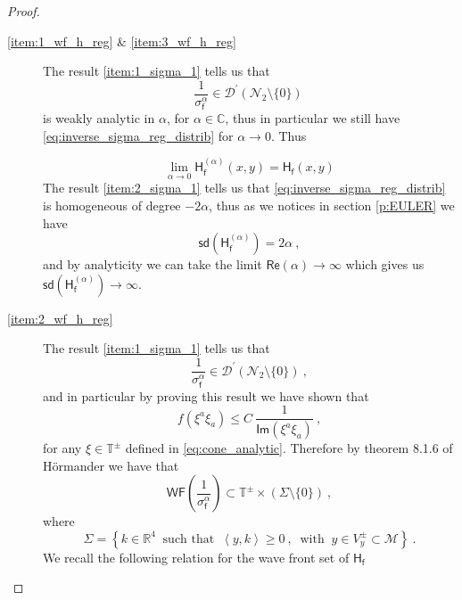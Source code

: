 \documentclass[11pt]{book}
\newcommand{\hilight}[1]{\colorbox{yellow!80!black}{#1}}
\newcommand{\WF}{\mathsf{WF}}
\newcommand{\sd}{\mathsf{sd}}
\renewcommand{\Re}{\mathsf{Re}}
\renewcommand{\Im}{\mathsf{Im}}
\newcommand{\sm}[1]{\left\langle#1\right\rangle}
\newcommand{\Dcal}{\mathcal{D}}
\newcommand{\Mcal}{\mathcal{M}}
\newcommand{\Ncal}{\mathcal{N}}
\newcommand{\Cbb}{\mathbb{C}}
\newcommand{\Rbb}{\mathbb{R}}
\newcommand{\Tbb}{\mathbb{T}}
\newcommand{\Hsf}{\mathsf{H}}
\newcommand{\fsf}{\mathsf{f}}
\theoremstyle{break}
\begin{document}
\begin{proof}
\begin{description}
\item[\ref{item:1_wf_h_reg} \& \ref{item:3_wf_h_reg}] 
%
The result \ref{item:1_sigma_1} tells us that 
%
\begin{equation*}
\frac{1}{\sigma_\fsf^\alpha} \in \Dcal^\prime(\Ncal_2\setminus\{0\}) \
\label{eq:inverse_sigma_reg_distrib}
\end{equation*}
%
is weakly analytic in $\alpha$, for $\alpha\in\Cbb$, thus in particular we still have \eqref{eq:inverse_sigma_reg_distrib} for $\alpha\to0$. Thus

\begin{equation*}
\lim_{\alpha\to0} \Hsf^{(\alpha)}_\fsf(x,y) = \Hsf_\fsf(x,y) 
\end{equation*}
%
The result \ref{item:2_sigma_1} tells us that \eqref{eq:inverse_sigma_reg_distrib} is homogeneous of degree $-2\alpha$, thus as we notices in section \ref{p:EULER} we have 
%
\begin{equation*}
\sd(\Hsf^{(\alpha)}_\fsf) = 2\alpha \ ,
\end{equation*}
%
and by analyticity we can take the limit \hilight{$\Re(\alpha) \to \infty$ which gives us $\sd(\Hsf^{(\alpha)}_\fsf)\to\infty$.}
%
%
\item[\ref{item:2_wf_h_reg}] 
%
The result \ref{item:1_sigma_1} tells us that 
%
\begin{equation*}
\frac{1}{\sigma_\fsf^\alpha} \in \Dcal^\prime(\Ncal_2\setminus\{0\}) \ ,
\end{equation*}
%
and in particular by proving this result we have shown that
%
\begin{equation*}
f(\xi^a\xi_{a}) \leq C \ \frac{1}{\Im(\xi^{a}\xi_{a})} \ , 
\end{equation*}
%
for any $\xi \in \Tbb^\pm$ defined in \eqref{eq:cone_analytic}. Therefore by theorem 8.1.6 of Hörmander \cite{HORMANDER_1990} we have that 
%
\begin{equation}
\WF\left(\frac{1}{\sigma_\fsf^\alpha}\right) \subset  \Tbb^\pm \times \left( \Sigma \setminus \{0\} \right) \ ,
\label{eq:wf_invers_sigma_in_v+-}
\end{equation}
%
where
%
\begin{equation*}
\Sigma = \left\{ k \in \Rbb^4 \ \mbox{ such that } \ \sm{y,k} \geq 0 \ , \ \mbox{ with } \ y \in V^\pm_y \subset \Mcal \right\} \ . 
\end{equation*}
%
We recall the following relation for the wave front set of $\Hsf_\fsf$
%
\begin{equation*}

\end{equation*}
\end{description}
\end{proof}
\end{document}
